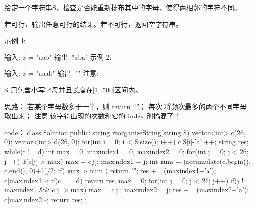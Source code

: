 给定一个字符串S，检查是否能重新排布其中的字母，使得两相邻的字符不同。

若可行，输出任意可行的结果。若不可行，返回空字符串。

示例 1:

输入: S = "aab"
输出: "aba"
示例 2:

输入: S = "aaab"
输出: ""
注意:

S 只包含小写字母并且长度在[1, 500]区间内。
























思路：
若某个字母数多于一半，则 return “”；
每次 将频次最多的两个不同字母取出来；
注意 该字符出现的次数和它的 index 别搞混了！



























code：
class Solution {
public:
    string reorganizeString(string S) {
        vector<int> c(26, 0);
        vector<int> d(26, 0);
        for(int i = 0; i < S.size(); i++) c[S[i]-'a']++;
        string res;
        while(c != d)
        {
            int max = 0, maxindex1 = 0, maxindex2 = 0;
            for(int j = 0; j < 26; j++)
            {
                if(c[j] > max)
                {
                    max = c[j]; maxindex1 = j;
                }
            }
            int num = (accumulate(c.begin(), c.end(), 0)+1)/2;
            if( max > num ) return "";
            res += (maxindex1+'a');
            c[maxindex1]--;
            if(c == d) return res;
            max = 0;
            for(int j = 0; j < 26; j++)
            {
                if(j != maxindex1 && c[j] > max)
                {
                    max = c[j]; maxindex2 = j;
                }
            }
            res += (maxindex2+'a');
            c[maxindex2]--;
        }
        return res;
    }
};